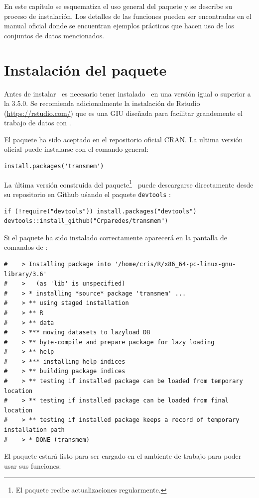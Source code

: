 En este capítulo se esquematiza el uso general del paquete y se describe su proceso de instalación. Los detalles de las funciones pueden ser encontradas en el manual oficial donde se encuentran ejemplos prácticos que hacen uso de los conjuntos de datos mencionados.

\clearpage
\section{Instalación del paquete}
\enlargethispage{1\baselineskip}
Antes de instalar \trm\ es necesario tener instalado \R\ en una versión igual o superior a la 3.5.0. Se recomienda adicionalmente la instalación de Rstudio (\url{https://rstudio.com/}) que es una \ac{GIU} diseñada para facilitar grandemente el trabajo de datos con \R. 

El paquete ha sido aceptado en el repositorio oficial \ac{CRAN}. La ultima versión oficial puede instalarse con el comando general:
\begin{lstlisting}[belowskip=-2.6\baselineskip]
install.packages('transmem')
\end{lstlisting}

La última versión construida del paquete\footnote{El paquete recibe actualizaciones regularmente.} \trm\ puede descargarse directamente desde su repositorio en Github uśando el paquete \verb|devtools| \citep{Hadley2019}:
\begin{lstlisting}[belowskip=-2.6\baselineskip]
if (!require("devtools")) install.packages("devtools")
devtools::install_github("Crparedes/transmem")
\end{lstlisting}


Si el paquete ha sido instalado correctamente aparecerá en la pantalla de comandos de \R:
\begin{lstlisting}
#    > Installing package into '/home/cris/R/x86_64-pc-linux-gnu-library/3.6'
#    >   (as 'lib' is unspecified)
#    > * installing *source* package 'transmem' ...
#    > ** using staged installation
#    > ** R
#    > ** data
#    > *** moving datasets to lazyload DB
#    > ** byte-compile and prepare package for lazy loading
#    > ** help
#    > *** installing help indices
#    > ** building package indices
#    > ** testing if installed package can be loaded from temporary location
#    > ** testing if installed package can be loaded from final location
#    > ** testing if installed package keeps a record of temporary installation path
#    > * DONE (transmem)
\end{lstlisting}
El paquete estará listo para ser cargado en el ambiente de trabajo para poder usar sus funciones:

